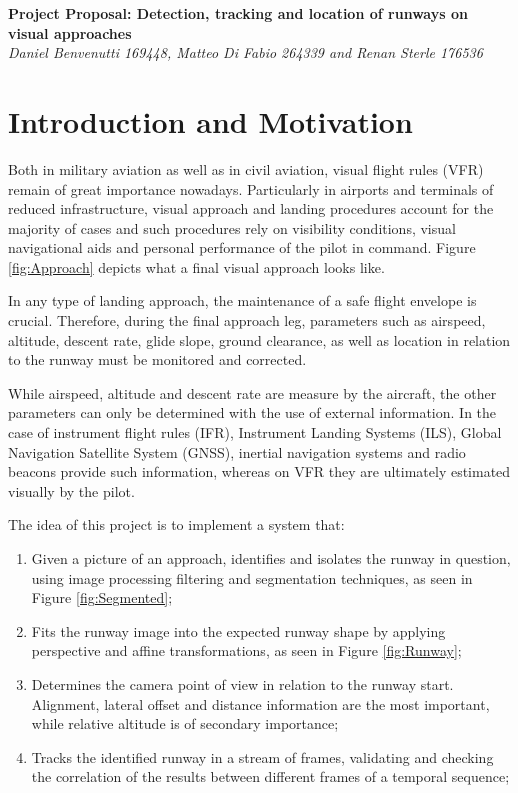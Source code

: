 \documentclass[11pt, a4paper]{article}
\begin{document}
\begin{titlepage}
   \begin{center}
      \Large\textbf{Project Proposal: Detection, tracking and location of runways on visual approaches}\\
      \large\textit{Daniel Benvenutti 169448, Matteo Di Fabio 264339 and Renan Sterle 176536}
   \end{center}
\end{titlepage}

\section{Introduction and Motivation}

	Both in military aviation as well as in civil aviation, visual flight rules (VFR) remain of great importance nowadays. Particularly in airports and terminals of reduced infrastructure, visual approach and landing procedures account for the majority of cases and such procedures rely on visibility conditions, visual navigational aids and personal performance of the pilot in command. Figure \ref{fig:Approach} depicts what a final visual approach looks like.

	In any type of landing approach, the maintenance of a safe flight envelope is crucial. Therefore, during the final approach leg, parameters such as airspeed, altitude, descent rate, glide slope, ground clearance, as well as location in relation to the runway must be monitored and corrected.

	While airspeed, altitude and descent rate are measure by the aircraft, the other parameters can only be determined with the use of external information. In the case of instrument flight rules (IFR), Instrument Landing Systems (ILS), Global Navigation Satellite System (GNSS), inertial navigation systems and radio beacons provide such information, whereas on VFR they are ultimately estimated visually by the pilot.

	The idea of this project is to implement a system that:

	\begin{enumerate}
		\item Given a picture of an approach, identifies and isolates the runway in question, using image processing filtering and segmentation techniques, as seen in Figure \ref{fig:Segmented};
		\item Fits the runway image into the expected runway shape by applying perspective and affine transformations, as seen in Figure \ref{fig:Runway};
		\item Determines the camera point of view in relation to the runway start. Alignment, lateral offset and distance information are the most important, while relative altitude is of secondary importance;
		\item Tracks the identified runway in a stream of frames, validating and checking the correlation of the results between different frames of a temporal sequence;

	\end{enumerate}
	
\end{document}

